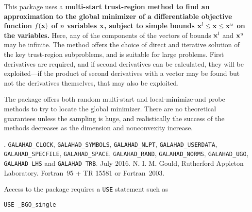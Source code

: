 \documentclass{galahad}
\newcommand{\packagename}{BGO}
\newcommand{\fullpackagename}{\libraryname\_\packagename}
\begin{document}
\galheader


\galsummary
This package uses a {\bf multi-start trust-region method to find an 
approximation to the global minimizer of a differentiable objective 
function $f({\mathbf{x}})$ of $n$ variables ${\mathbf{x}}$, subject to simple bounds 
${\mathbf{x}}^l \leq {\mathbf{x}} \leq {\mathbf{x}}^u$ on the variables.}
Here, any of the components of the vectors of bounds ${\mathbf{x}}^l$ and ${\mathbf{x}}^u$ 
may be infinite. The method offers the choice of direct
and iterative solution of the key trust-region subproblems, and
is suitable for large problems. First derivatives are required,
and if second derivatives can be calculated, they will be exploited---if
the product of second derivatives with a vector may be found but
not the derivatives themselves, that may also be exploited.

The package offers both random multi-start and local-minimize-and probe 
methods to try to locate the global minimizer. There are no theoretical 
guarantees unless the sampling is huge, and realistically the success of 
the methods decreases as the dimension and nonconvexity increase.


\galattributes
\galversions{\tt  \fullpackagename\_single, \fullpackagename\_double}.
\galuses
{\tt GALAHAD\_CLOCK},
{\tt GALAHAD\_SY\-M\-BOLS},
{\tt GALAHAD\_NLPT},
{\tt GALAHAD\_USERDATA},
{\tt GALAHAD\_SPECFILE},
{\tt GALAHAD\_SPACE},
{\tt GALAHAD\_RAND},
{\tt GALAHAD\_\-NORMS},
{\tt GALAHAD\_UGO},
{\tt GALAHAD\_LHS}
and 
{\tt GALAHAD\_TRB}.
\galdate July 2016.
\galorigin N. I. M. Gould, Rutherford Appleton Laboratory.
\gallanguage Fortran~95 + TR 15581 or Fortran~2003.


\galhowto


Access to the package requires a {\tt USE} statement such as

\medskip{}

\hspace{8mm} {\tt USE \fullpackagename\_single}

\medskip{}
\end{document}
